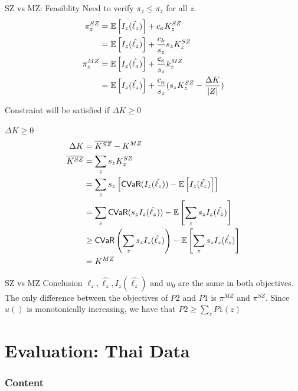 \documentclass{beamer}
\def\bbe{{\Bbb{E}}}
\def\bbe{{\Bbb{E}}}
\begin{document}
\begin{frame}{SZ vs MZ: Feasiblity}
    Need to verify $\pi_z \leq \overline{\pi_z}$ for all $z$. 
    \begin{align*}
    \pi^{SZ}_z &= \bbe \left [ I_z(\hat{\ell_z}) \right ] + c_{\kappa} K^{SZ}_z\\
    &= \bbe \left [ I_z(\hat{\ell_z}) \right ] + \frac{c_{k}}{s_z}s_z K^{SZ}_z \\
    \pi^{MZ}_z &= \bbe \left [ I_z(\hat{\ell_z}) \right ] +  \frac{c_{\kappa}}{s_z} k^{MZ}_z\\
    &= \bbe \left [ I_z(\hat{\ell_z}) \right ] +  \frac{c_{\kappa}}{s_z} (s_z K^{SZ}_z - \frac{\Delta K}{|Z|})
\end{align*}

Constraint will be satisfied if $\Delta K \geq 0$ 
\end{frame}

\begin{frame}{$\Delta K \geq 0$}
    \begin{align*}
        \Delta K &= \overline{K^{SZ}} - K^{MZ}\\
        \overline{K^{SZ}} &= \sum_z s_z K^{SZ}_z \\
        &= \sum_z s_z \left [ {\sf CVaR}(I_z(\hat{\ell_z}) ) - \bbe \left [ I_z(\hat{\ell_z})  \right ] \right ] \\
        &= \sum_z {\sf CVaR}(s_z I_z(\hat{\ell_z}) ) - \bbe \left [ \sum_z s_z I_z(\hat{\ell_z})  \right ] \\
        &\geq {\sf CVaR} \left (\sum_z s_z I_z(\hat{\ell_z}) \right ) - \bbe \left [ \sum_z s_z I_z(\hat{\ell_z})  \right ] \\
        &= K^{MZ}
    \end{align*}
\end{frame}

\begin{frame}{SZ vs MZ Conclusion}
    $\ell_z, \hat{\ell_z}, I_z(\hat{\ell_z})$ and $w_0$ are the same in both objectives. The only difference between the objectives of $P2$ and $P1$ is $\pi^{MZ}$ and $\pi^{SZ}$. Since $u()$ is monotonically increasing, we have that $P2 \geq \sum_z P1(z)$
    
\end{frame}

\section{Evaluation: Thai Data}
\begin{frame}
    \frametitle{Content}
    \tableofcontents[currentsection]
  \end{frame}
\end{document}
